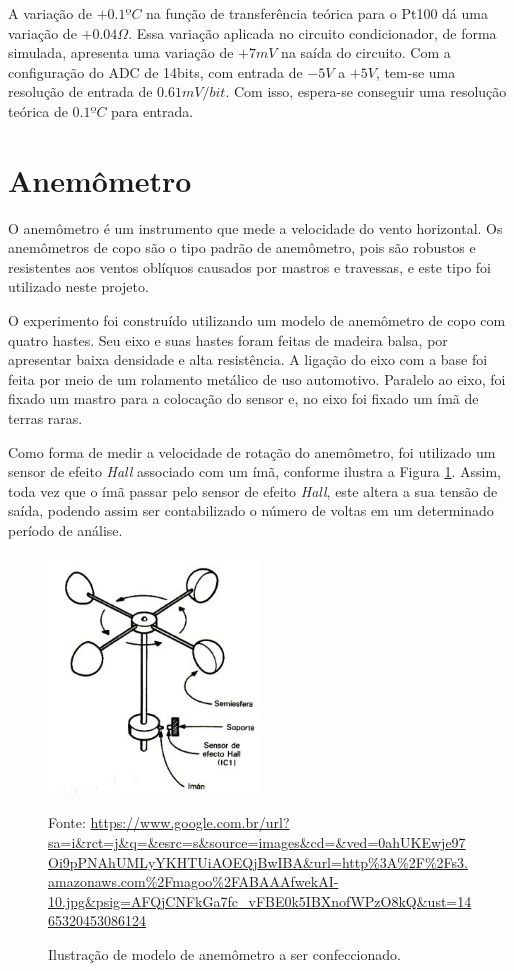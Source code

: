 \documentclass[a4paper]{instrumentacao}
\begin{document}
A variação de $+0.1ºC$ na função de transferência teórica para o Pt100 dá uma variação de $+0.04\Omega$. Essa variação aplicada no circuito condicionador, de forma simulada, apresenta uma variação de $+7mV$ na saída do circuito. Com a configuração do ADC de 14bits, com entrada de $-5V$ a $+5V$, tem-se uma resolução de entrada de $0.61mV/bit$. Com isso, espera-se conseguir uma resolução teórica de $0.1ºC$ para entrada.

\section{Anemômetro}

O anemômetro é um instrumento que mede a velocidade do vento horizontal. Os anemômetros de copo são o tipo padrão de anemômetro, pois são robustos e resistentes aos ventos oblíquos causados por mastros e travessas, e este tipo foi utilizado neste projeto.

O experimento foi construído utilizando um modelo de anemômetro de copo com quatro hastes. Seu eixo e suas hastes foram feitas de madeira balsa, por apresentar baixa densidade e alta resistência. A ligação do eixo com a base foi feita por meio de um rolamento metálico de uso automotivo. Paralelo ao eixo, foi fixado um mastro para a colocação do sensor e, no eixo foi fixado um ímã de terras raras.

Como forma de medir a velocidade de rotação do anemômetro, foi utilizado um sensor de efeito \textit{Hall} associado com um ímã, conforme ilustra a Figura \ref{fig:anemometro-ilustracao}. Assim, toda vez que o ímã passar pelo sensor de efeito \textit{Hall}, este altera a sua tensão de saída, podendo assim ser contabilizado o número de voltas em um determinado período de análise.

\begin{figure}[H]
	\centering \includegraphics[width=0.5\textwidth]{anemometro-ilustracao.jpg}
	\caption{Ilustração de modelo de anemômetro a ser confeccionado.}
	Fonte:  \url{https://www.google.com.br/url?sa=i&rct=j&q=&esrc=s&source=images&cd=&ved=0ahUKEwje97Oi9pPNAhUMLyYKHTUiAOEQjBwIBA&url=http\%3A\%2F\%2Fs3.amazonaws.com\%2Fmagoo\%2FABAAAfwekAI-10.jpg&psig=AFQjCNFkGa7fc_vFBE0k5IBXnofWPzO8kQ&ust=1465320453086124}
	\label{fig:anemometro-ilustracao}
\end{figure}
\end{document}
